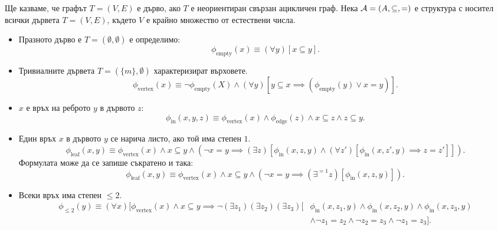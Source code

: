 \begin{problem}
  Ще казваме, че графът $T = (V,E)$ е дърво, ако $T$ е неориентиран свързан ацикличен граф.
  Нека $\mathcal{A} = (A,\subseteq,=)$ е структура с носител всички дървета $T = (V,E)$, където $V$ е крайно множество от естествени числа.
  \begin{itemize}
  \item
    Празното дърво е $T = (\emptyset,\emptyset)$ е определимо:
    \[\phi_{\text{empty}}(x) \equiv (\forall y)[x \subseteq y].\]
  \item
    Тривиалните дървета $T = (\{m\},\emptyset)$ характеризират върховете. 
    \[\phi_{\text{vertex}}(x) \equiv \neg \phi_{\text{empty}}(X) \land (\forall y)[y \subseteq x \implies (\phi_{\text{empty}}(y) \lor x = y)].\]
  \item
    $x$ е връх на реброто $y$ в дървото $z$:
    \[\phi_{\text{in}}(x,y,z) \equiv \phi_{\text{vertex}}(x) \land \phi_{\text{edge}}(z) \land x \subseteq z \land z \subseteq y.\]
  \item
    Един връх $x$ в дървото $y$ се нарича листо, ако той има степен $1$.
    \[\phi_{\text{leaf}}(x,y) \equiv \phi_{\text{vertex}}(x) \land x \subseteq y \land (\neg x = y \implies (\exists z)[\phi_{\text{in}}(x,z,y) \land (\forall z')[\phi_{\text{in}}(x,z',y) \implies z = z']]).\]
    Формулата може да се запише съкратено и така:
    \[\phi_{\text{leaf}}(x,y) \equiv \phi_{\text{vertex}}(x) \land x \subseteq y \land (\neg x = y \implies (\exists^{=1} z)[\phi_{\text{in}}(x,z,y)]).\]
  \item
    Всеки връх има степен $\leq 2$.
    \begin{align*}
      \phi_{\leq 2}(y) \equiv (\forall x)[\phi_{\text{vertex}}(x) \land x \subseteq y \implies \neg (\exists z_1)(\exists z_2)(\exists z_3)[ & \phi_{\text{in}}(x,z_1,y) \land \phi_{\text{in}}(x,z_2,y) \land \phi_{\text{in}}(x,z_3,y) \\
                                                                                                                         & \land \neg z_1 = z_2 \land \neg z_2 = z_3 \land \neg z_1 = z_3 ].
    \end{align*}
  \end{itemize}
\end{problem}


